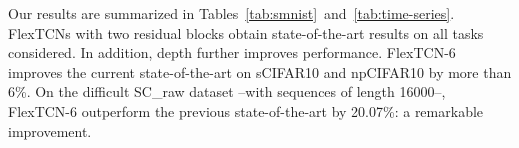 \documentclass{article} \usepackage{iclr2022_conference,times}
\begin{document}
Our results are summarized in Tables~\ref{tab:smnist}~and~\ref{tab:time-series}. FlexTCNs with two residual blocks obtain state-of-the-art results on all tasks considered. In addition, depth further improves performance. FlexTCN-6 improves the current state-of-the-art on sCIFAR10 and npCIFAR10 by more than 6\%. On the difficult SC\_raw dataset --with sequences of length 16000--, FlexTCN-6 outperform the previous state-of-the-art by 20.07\%: a remarkable improvement.

\begin{table}
\RawFloats
\centering
\begin{minipage}{0.48 \textwidth}
\centering
\caption{Test accuracy on CT, SC and SC\_raw}
\label{tab:time-series}
\vspace{-2mm}
\begin{small}

\end{small}
\end{minipage}
\end{table}
\end{document}
